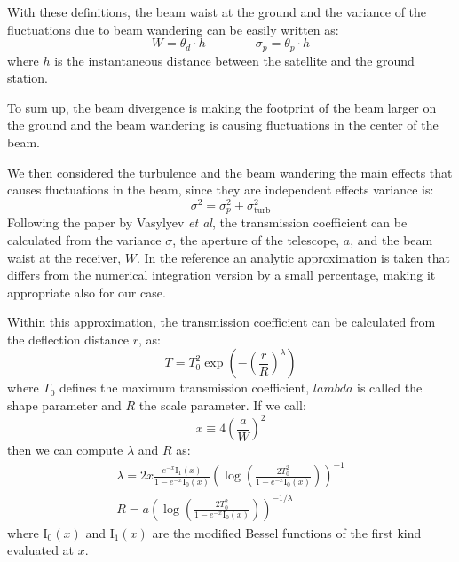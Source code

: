\documentclass[%
 reprint,
 amsmath,amssymb,
 aps,
]{revtex4-1}
\begin{document}
With these definitions, the beam waist at the ground and the variance of the fluctuations due to beam wandering can be easily written as: 
\begin{equation}
    W = \theta_d\cdot h\qquad\qquad \sigma_{p}= \theta_p\cdot h
\end{equation}
where $h$ is the instantaneous distance between the satellite and the ground station.

To sum up, the beam divergence is making the footprint of the beam larger on the ground and the beam wandering is causing fluctuations in the center of the beam.

We then considered the turbulence and the beam wandering the main effects that causes fluctuations in the beam, since they are independent effects variance is:
\begin{equation}
    \sigma^2 =\sigma_p^2+\sigma_{\mathrm{turb}}^2 
\end{equation}
Following the paper by Vasylyev \textit{et al}, the transmission coefficient can be calculated from the variance $\sigma$, the aperture of the telescope, $a$, and the beam waist at the receiver, $W$. In the reference an analytic approximation is taken that differs from the numerical integration version by a small percentage, making it appropriate also for our case.

Within this approximation, the transmission coefficient can be calculated from the deflection distance $r$, as:
\begin{equation}
    T = T_0^2\exp\left(-\left(\frac{r}{R}\right)^{\lambda}\right)
    \label{T-r}
\end{equation}
where $T_0$ defines the maximum transmission coefficient, $lambda$ is called the shape parameter and $R$ the scale parameter. If we call:
\begin{equation}
 x\equiv4\left(\frac{a}{W}\right)^2
\end{equation}
then we can compute $\lambda$ and $R$ as:
\begin{equation}
\begin{split}
        \lambda = 2x\frac{e^{-x}\mathrm{I}_1(x)}{1-e^{-x}\mathrm{I}_0(x)}\left(\log \left(\frac{2T_0^2}{1-e^{-x}\mathrm{I}_0(x)}\right)\right)^{-1} \\
         R = a\left(\log\left(\frac{2T_0^2}{1-e^{-x}\mathrm{I}_0(x)}\right)\right)^{-1/\lambda}
\end{split}
\end{equation}
where $\mathrm{I}_0(x)$ and $\mathrm{I}_1(x)$ are the modified Bessel functions of the first kind evaluated at $x$.
\end{document}
